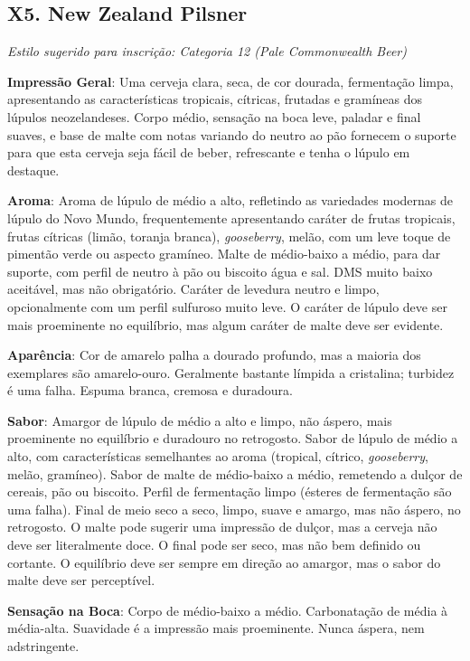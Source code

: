 \subsection*{X5. New Zealand Pilsner}

\textit{Estilo sugerido para inscrição: Categoria 12 (Pale Commonwealth Beer)}

\textbf{Impressão Geral}: Uma cerveja clara, seca, de cor dourada, fermentação limpa, apresentando as características tropicais, cítricas, frutadas e gramíneas dos lúpulos neozelandeses. Corpo médio, sensação na boca leve, paladar e final suaves, e base de malte com notas variando do neutro ao pão fornecem o suporte para que esta cerveja seja fácil de beber, refrescante e tenha o lúpulo em destaque.

\textbf{Aroma}: Aroma de lúpulo de médio a alto, refletindo as variedades modernas de lúpulo do Novo Mundo, frequentemente apresentando caráter de frutas tropicais, frutas cítricas (limão, toranja branca), \textit{gooseberry}, melão, com um leve toque de pimentão verde ou aspecto gramíneo. Malte de médio-baixo a médio, para dar suporte, com perfil de neutro à pão ou biscoito água e sal. DMS muito baixo aceitável, mas não obrigatório. Caráter de levedura neutro e limpo, opcionalmente com um perfil sulfuroso muito leve. O caráter de lúpulo deve ser mais proeminente no equilíbrio, mas algum caráter de malte deve ser evidente.

\textbf{Aparência}: Cor de amarelo palha a dourado profundo, mas a maioria dos exemplares são amarelo-ouro. Geralmente bastante límpida a cristalina; turbidez é uma falha. Espuma branca, cremosa e duradoura.

\textbf{Sabor}: Amargor de lúpulo de médio a alto e limpo, não áspero, mais proeminente no equilíbrio e duradouro no retrogosto. Sabor de lúpulo de médio a alto, com características semelhantes ao aroma (tropical, cítrico, \textit{gooseberry}, melão, gramíneo). Sabor de malte de médio-baixo a médio, remetendo a dulçor de cereais, pão ou biscoito. Perfil de fermentação limpo (ésteres de fermentação são uma falha). Final de meio seco a seco, limpo, suave e amargo, mas não áspero, no retrogosto. O malte pode sugerir uma impressão de dulçor, mas a cerveja não deve ser literalmente doce. O final pode ser seco, mas não bem definido ou cortante. O equilíbrio deve ser sempre em direção ao amargor, mas o sabor do malte deve ser perceptível.

\textbf{Sensação na Boca}: Corpo de médio-baixo a médio. Carbonatação de média à média-alta. Suavidade é a impressão mais proeminente. Nunca áspera, nem adstringente.

